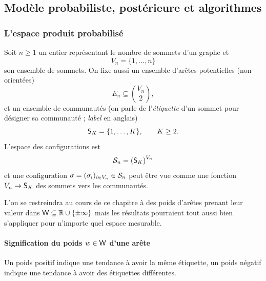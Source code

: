 \subsection{Modèle probabiliste, postérieure et algorithmes}
\label{sec:chapII_modele_bayesien}

\subsubsection{L'espace produit probabilisé}

Soit $n\geq1$ un entier représentant le nombre de sommets d'un graphe et
\[
    V_n=\{1,\ldots,n\}
\]
son ensemble de sommets. On fixe aussi un ensemble d'arêtes potentielles (non orientées)
\[
    E_n\subseteq \binom{V_n}{2},
\]
et un ensemble de communautés (on parle de l'\emph{étiquette} d'un sommet pour désigner sa communauté ; \emph{label} en anglais)
\[
    \mathsf S_K=\{1,\ldots,K\},\qquad K\geq2.
\]
L'espace des configurations est
\[
    \mathcal S_n=\left(\mathsf S_K\right)^{V_n}
\]
et une configuration $\sigma=(\sigma_i)_{i\in V_n} \in \mathcal S_n$ peut être vue comme une fonction $V_n \to \mathsf S_K$ des sommets vers les communautés.

L'on se restreindra au cours de ce chapitre à des poids d'arêtes prenant leur valeur dans $\mathsf W\subseteq\mathbb R\cup\{\pm\infty\}$ mais les résultats pourraient tout aussi bien s'appliquer pour n'importe quel espace mesurable. 

\paragraph{Signification du poids $w \in \mathsf W$ d'une arête} 
Un poids positif indique une tendance à avoir la même étiquette, un poids négatif indique une tendance à avoir des étiquettes différentes. %

